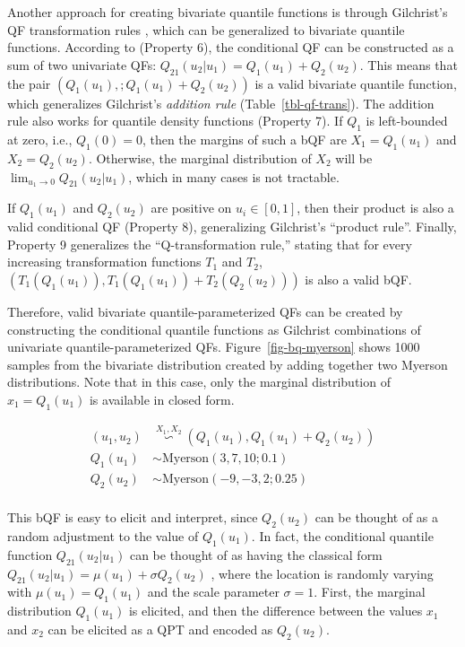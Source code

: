 \documentclass[
  fleqn,
  deca,
  blindrev
]{informs4}
\begin{document}
Another approach for creating bivariate quantile functions is through
Gilchrist's QF transformation rules
\citep{gilchrist2000StatisticalModellingQuantile}, which can be
generalized to bivariate quantile functions. According to
\citep{nair2023PropertiesBivariateDistributions} (Property 6), the
conditional QF can be constructed as a sum of two univariate QFs:
\(Q_{21}(u_2\vert u_1) = Q_1(u_1) + Q_2(u_2)\). This means that the pair
\((Q_1(u_1), ; Q_1(u_1) + Q_2(u_2))\) is a valid bivariate quantile
function, which generalizes Gilchrist's \emph{addition rule}
(Table~\ref{tbl-qf-trans}). The addition rule also works for quantile
density functions (Property 7). If \(Q_1\) is left-bounded at zero,
i.e., \(Q_1(0) = 0\), then the margins of such a bQF are
\(X_1 = Q_1(u_1)\) and \(X_2 = Q_2(u_2)\). Otherwise, the marginal
distribution of \(X_2\) will be
\(\lim_{u_1 \rightarrow 0}Q_{21}(u_2\vert u_1)\), which in many cases is
not tractable.

If \(Q_1(u_1)\) and \(Q_2(u_2)\) are positive on \(u_i \in [0,1]\), then
their product is also a valid conditional QF (Property 8), generalizing
Gilchrist's ``product rule''. Finally, Property 9 generalizes the
``Q-transformation rule,'' stating that for every increasing
transformation functions \(T_1\) and \(T_2\),
\(\left(T_1(Q_1(u_1)), T_1(Q_1(u_1)) + T_2(Q_2(u_2))\right)\) is also a
valid bQF.

Therefore, valid bivariate quantile-parameterized QFs can be created by
constructing the conditional quantile functions as Gilchrist
combinations of univariate quantile-parameterized QFs.
Figure~\ref{fig-bq-myerson} shows 1000 samples from the bivariate
distribution created by adding together two Myerson distributions. Note
that in this case, only the marginal distribution of \(x_1 = Q_1(u_1)\)
is available in closed form.

\[
\begin{aligned}
(u_1, u_2) &\overset{X_1, X_2}{\backsim} (Q_1(u_1), Q_1(u_1)+Q_2(u_2))\\
Q_1(u_1) &\sim\text{Myerson}(3,7,10; 0.1)\\
Q_2(u_2) &\sim \text{Myerson}(-9, -3, 2; 0.25)\\
\end{aligned}
\]

This bQF is easy to elicit and interpret, since \(Q_2(u_2)\) can be
thought of as a random adjustment to the value of \(Q_1(u_1)\). In fact,
the conditional quantile function \(Q_{21}(u_2\vert u_1)\) can be
thought of as having the classical form
\(Q_{21}(u_2\vert u_1) = \mu(u_1) + \sigma Q_2(u_2)\)
\citep{gilchrist2000StatisticalModellingQuantile}, where the location is
randomly varying with \(\mu(u_1) = Q_1(u_1)\) and the scale parameter
\(\sigma = 1\). First, the marginal distribution \(Q_1(u_1)\) is
elicited, and then the difference between the values \(x_1\) and \(x_2\)
can be elicited as a QPT and encoded as \(Q_2(u_2)\).
\end{document}
